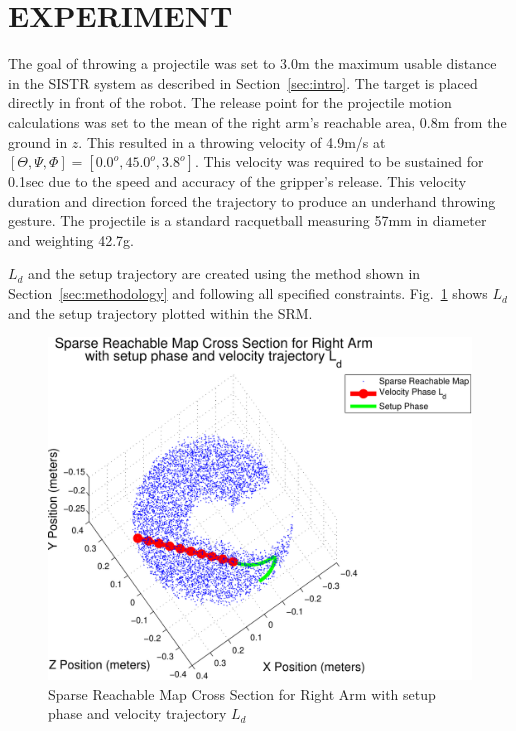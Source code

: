 \section{EXPERIMENT}\label{sec:exp}
The goal of throwing a projectile was set to 3.0m the maximum usable distance in the SISTR system as described in Section~\ref{sec:intro}.  The target is placed directly in front of the robot.  The release point for the projectile motion calculations was set to the mean of the right arm's reachable area, 0.8m from the ground in $z$.  This resulted in a throwing velocity of 4.9m/s at $[\Theta, \Psi, \Phi] =[0.0^o,45.0^o, 3.8^o]$.  This velocity was required to be sustained for 0.1sec due to the speed and accuracy of the gripper's release.  This velocity duration and direction forced the trajectory to produce an underhand throwing gesture.  The projectile is a standard racquetball measuring 57mm in diameter and weighting 42.7g.

$L_d$ and the setup trajectory are created using the method shown in Section~\ref{sec:methodology} and following all specified constraints.  Fig.~\ref{fig:3dThrowPlot1} shows $L_d$ and the setup trajectory plotted within the SRM.

\begin{figure}[thpb]
  \centering
\includegraphics[width=1.0\columnwidth]{./MATLAB/throwTraj3D.pdf}
  \caption{Sparse Reachable Map Cross Section for Right Arm with setup phase and velocity trajectory $L_d$ }
  \label{fig:3dThrowPlot1}
\end{figure}


